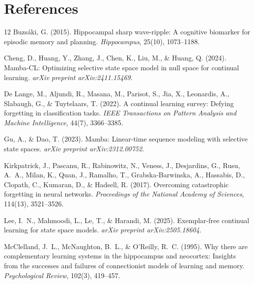 \documentclass[11pt,a4paper]{article}
\begin{document}
\section{References}
{\footnotesize
\setlength{\bibsep}{0.05em}
\renewcommand{\section}[2]{}%
\begin{thebibliography}{12}
Buzs\'aki, G. (2015). Hippocampal sharp wave-ripple: A cognitive biomarker for episodic memory and planning. \emph{Hippocampus}, 25(10), 1073--1188.

Cheng, D., Huang, Y., Zhang, J., Chen, K., Liu, M., \& Huang, Q. (2024). Mamba-CL: Optimizing selective state space model in null space for continual learning. \emph{arXiv preprint arXiv:2411.15469}.

De Lange, M., Aljundi, R., Masana, M., Parisot, S., Jia, X., Leonardis, A., Slabaugh, G., \& Tuytelaars, T. (2022). A continual learning survey: Defying forgetting in classification tasks. \emph{IEEE Transactions on Pattern Analysis and Machine Intelligence}, 44(7), 3366--3385.

Gu, A., \& Dao, T. (2023). Mamba: Linear-time sequence modeling with selective state spaces. \emph{arXiv preprint arXiv:2312.00752}.

Kirkpatrick, J., Pascanu, R., Rabinowitz, N., Veness, J., Desjardins, G., Rusu, A.~A., Milan, K., Quan, J., Ramalho, T., Grabska-Barwinska, A., Hassabis, D., Clopath, C., Kumaran, D., \& Hadsell, R. (2017). Overcoming catastrophic forgetting in neural networks. \emph{Proceedings of the National Academy of Sciences}, 114(13), 3521--3526.

Lee, I.~N., Mahmoodi, L., Le, T., \& Harandi, M. (2025). Exemplar-free continual learning for state space models. \emph{arXiv preprint arXiv:2505.18604}.

McClelland, J.~L., McNaughton, B.~L., \& O'Reilly, R.~C. (1995). Why there are complementary learning systems in the hippocampus and neocortex: Insights from the successes and failures of connectionist models of learning and memory. \emph{Psychological Review}, 102(3), 419--457.


\end{thebibliography}}
\end{document}
